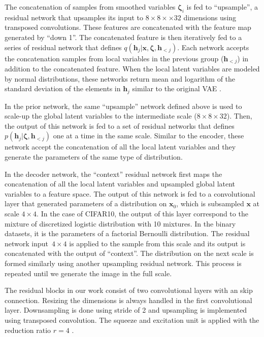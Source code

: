 \documentclass{article}
\newcommand{\x}{{\pmb{x}}}
\newcommand{\h}{{\pmb{h}}}
\newcommand{\bzeta}{{\pmb{\zeta}}}
\begin{document}
The concatenation of samples from smoothed variables $\bzeta_i$ is fed to ``upsample'', a residual network that upsamples its 
input to $8\times8\times\times32$ dimensions using transposed convolutions. These features are concatenated with the feature
map generated by ``down 1''.  The concatenated feature is then iteratively fed to a series of residual network 
that defines $q(\h_j | \x, \bzeta, \h_{<j})$. Each network accepts the concatenation samples from local variables 
in the previous group ($\h_{<j}$) in addition to the concatenated feature. When the local latent variables are modeled 
by normal distributions, these networks return mean and logarithm of the standard deviation of the elements in $\h_j$ similar to the original VAE \cite{kingma2014vae}.

In the prior network, the same ``upsample'' network defined above is used to scale-up the global latent variables to the intermediate scale ($8\times8\times32$). 
Then, the output of this network is fed to a set of residual networks that defines $p(\h_j | \bzeta, \h_{<j})$ one at a time in the same scale. 
Similar to the encoder, these network accept the concatenation of all the local latent variables and they generate the parameters of the same type of distribution.

In the decoder network, the ``context'' residual network first maps the concatenation of all the local latent variables and upsampled global latent variables to
a feature space. The output of this network is fed to a convolutional layer that generated parameters of a distribution on $\x_0$, which is subsampled 
$\x$ at scale $4\times4$. In the case of CIFAR10, the output of this layer correspond to the mixture of discretized logistic distribution \cite{salimans2017pixelcnn++} with 
10 mixtures. In the binary datasets, it is the parameters of a factorial Bernoulli distribution. The residual network input~$4\times4$ is applied to the
sample from this scale and its output is concatenated with the output of ``context''. The distribution on the next scale is formed similarly using another upsampling residual network. 
This process is repeated until we generate the image in the full scale. 

The residual blocks in our work consist of two convolutional layers with an skip connection. Resizing the dimensions is always handled in the first convolutional layer.
Downsampling is done using stride of 2 and upsampling is implemented using transposed convolution. The squeeze and excitation unit is applied with the reduction ratio $r = 4$ \cite{hu2017squeeze}.
\end{document}
